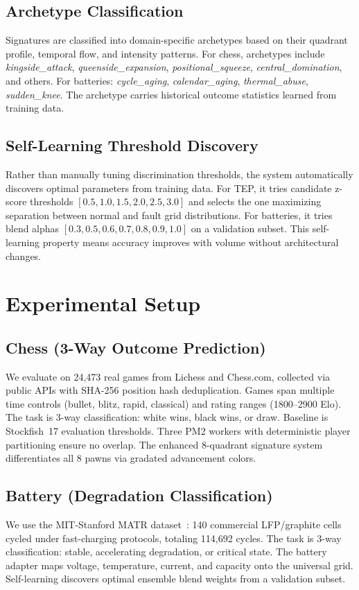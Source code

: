 \documentclass[11pt,a4paper]{article}
\begin{document}
\subsection{Archetype Classification}
Signatures are classified into domain-specific archetypes based on their quadrant
profile, temporal flow, and intensity patterns. For chess, archetypes include
\emph{kingside\_attack}, \emph{queenside\_expansion}, \emph{positional\_squeeze},
\emph{central\_domination}, and others. For batteries: \emph{cycle\_aging},
\emph{calendar\_aging}, \emph{thermal\_abuse}, \emph{sudden\_knee}. The archetype
carries historical outcome statistics learned from training data.

\subsection{Self-Learning Threshold Discovery}
Rather than manually tuning discrimination thresholds, the system automatically
discovers optimal parameters from training data. For TEP, it tries candidate z-score
thresholds $[0.5, 1.0, 1.5, 2.0, 2.5, 3.0]$ and selects the one maximizing
separation between normal and fault grid distributions. For batteries, it tries blend
alphas $[0.3, 0.5, 0.6, 0.7, 0.8, 0.9, 1.0]$ on a validation subset. This
self-learning property means accuracy improves with volume without architectural changes.

\section{Experimental Setup}

\subsection{Chess (3-Way Outcome Prediction)}
We evaluate on 24,473 real games from Lichess and Chess.com, collected via public APIs
with SHA-256 position hash deduplication. Games span multiple time controls (bullet,
blitz, rapid, classical) and rating ranges (1800--2900 Elo). The task is 3-way
classification: white wins, black wins, or draw. Baseline is Stockfish~17 evaluation
thresholds. Three PM2 workers with deterministic player partitioning ensure no
overlap. The enhanced 8-quadrant signature system differentiates all 8 pawns via
gradated advancement colors.

\subsection{Battery (Degradation Classification)}
We use the MIT-Stanford MATR dataset~\citep{severson2019}: 140 commercial LFP/graphite
cells cycled under fast-charging protocols, totaling 114,692 cycles. The task is 3-way
classification: stable, accelerating degradation, or critical state. The battery adapter
maps voltage, temperature, current, and capacity onto the universal grid. Self-learning
discovers optimal ensemble blend weights from a validation subset.
\end{document}
